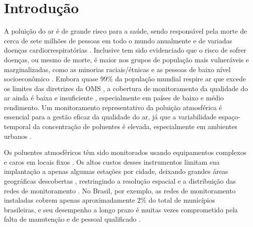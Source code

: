 \chapter{Introdução}

A poluição do ar é de grande risco para a saúde, sendo responsável pela morte de cerca de sete milhões de pessoas em todo o mundo anualmente e de variadas doenças cardiorrespiratórias \cite{who2021}. Inclusive tem sido evidenciado que o risco de sofrer doenças, ou mesmo de morte, é maior nos grupos de população mais vulneráveis e marginalizadas, como as minorias raciais/étnicas e as pessoas de baixo nível socioeconômico \cite{Jbaily2022AirGroups}. Embora quase 99\% da população mundial respire ar que excede os limites das diretrizes da OMS \cite{who2021}, a cobertura de monitoramento da qualidade do ar ainda é baixa e insuficiente \cite{Munir2019AnalysingSheffield}, especialmente em países de baixo e médio rendimento. Um monitoramento representativo da poluição atmosférica é essencial para a gestão eficaz da qualidade do ar, já que a variabilidade espaço-temporal da concentração de poluentes é elevada, especialmente em ambientes urbanos \cite{Kumar2015,Mead2013TheNetworks}.

Os poluentes atmosféricos têm sido monitorados usando equipamentos complexos e caros em locais fixos \cite{Kang2022PerformanceReview}. Os altos custos desses instrumentos limitam sua implantação a apenas algumas estações por cidade, deixando grandes áreas geográficas descobertas \cite{Munir2019AnalysingSheffield}, restringindo a resolução espacial e a distribuição das redes de monitoramento \cite{Jiao2016CommunityStates,Kumar2015}. No Brasil, por exemplo, as redes de monitoramento instaladas cobrem apenas aproximadamente 2\% do total de municípios brasileiras, e seu desempenho a longo prazo é muitas vezes comprometido pela falta de manutenção e de pessoal qualificado \cite{Vormittag2021AnaliseBrasil}.

